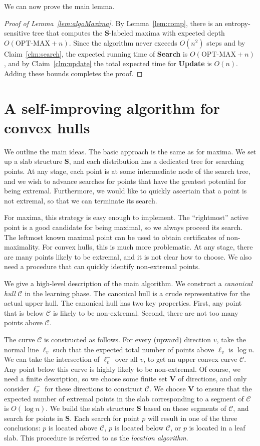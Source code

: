 \documentclass[letterpaper,11pt]{article}
\newcommand{\OPTMAX}{\text{OPT-MAX}}
\newcommand{\bS}{\textbf{S}}
\newcommand{\cC}{\mathcal{C}}
\begin{document}
We can now prove the main lemma.

\begin{proof}[Proof of Lemma~\ref{lem:algoMaxima}] 
By Lemma~\ref{lem:comp}, there is
an entropy-sensitive 
tree that computes the $\bS$-labeled 
maxima with expected depth $O(\OPTMAX + n)$.
Since the algorithm never exceeds
$O(n^2)$ steps and by Claim~\ref{clm:search}, the 
expected running time of 
\textbf{Search} is $O(\OPTMAX +  n)$, and 
by Claim~\ref{clm:update} the 
total expected time for \textbf{Update}
is $O(n)$. Adding these bounds completes 
the proof.
\end{proof}

\section{A self-improving algorithm for convex hulls}

We outline the main ideas. The basic approach
is the same as for maxima. We set up 
a slab structure $\bS$, and each
distribution has a dedicated tree for searching 
points. At any stage, each point
is at some intermediate node of the search tree, 
and we wish to advance searches for points 
that have the greatest potential for being extremal.
Furthermore, we would like to quickly 
ascertain that a point is not extremal, so that
we can terminate its search.

For maxima, this strategy is easy enough to 
implement. The ``rightmost'' active point 
is a good candidate for being maximal, so we always
proceed its search. The leftmost known maximal
point can be used to obtain certificates of non-maximality.
For convex hulls, this is much more problematic. At any 
stage, there are many points likely to be
extremal, and it is not clear how to choose.
We also need a procedure that can quickly identify
non-extremal points. 

We give a high-level 
description of the main algorithm.
We construct a \emph{canonical hull} 
$\cC$ in the learning phase. The canonical hull
is a crude representative for the actual 
upper hull. The canonical hull has two key 
properties. First, any point that is below 
$\cC$ is likely to be non-extremal. Second, 
there are not too many points above $\cC$. 

The curve $\cC$ is constructed as follows.
For every (upward) direction $v$, take the normal line $\ell_v$
such that the expected total number of points above $\ell_v$
is $\log n$. We can take the intersection of $\ell^-_v$ over all $v$,
to get an upper convex curve $\cC$. Any point below this curve is highly likely to be non-extremal.
Of course, we need a finite description, so we choose some finite set $\textbf{V}$ of directions,
and only consider $\ell^-_v$ for these directions to construct $\cC$. We choose $\textbf{V}$ to
ensure that the expected number of extremal points in the slab corresponding to a segment of $\cC$ is $O(\log n)$.
We build the slab
structure $\bS$ based on these segments of $\cC$, and search for points
in $\bS$. Each search for point $p$ will result in one of the three conclusions:
$p$ is located above $\cC$, $p$ is located below $\cC$, or $p$ is located in a leaf slab.
This procedure is referred to as the \emph{location algorithm}.  
\end{document}
